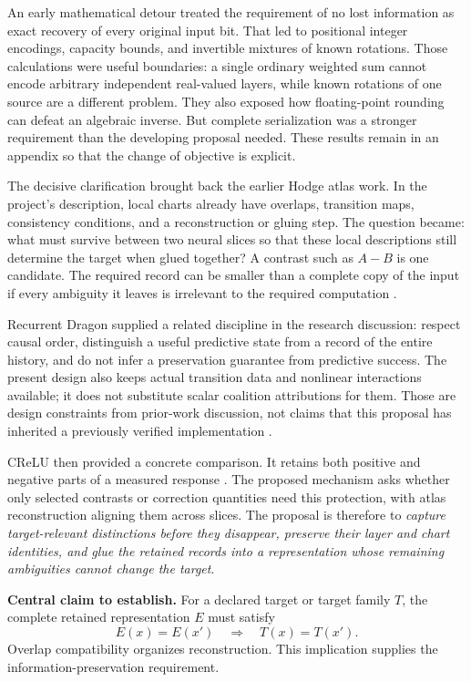 An early mathematical detour treated the requirement of no lost information as
exact recovery of every original input bit. That led to positional integer
encodings, capacity bounds, and invertible mixtures of known rotations. Those
calculations were useful boundaries: a single ordinary weighted sum cannot
encode arbitrary independent real-valued layers, while known rotations of one
source are a different problem. They also exposed how floating-point rounding
can defeat an algebraic inverse. But complete serialization was a stronger
requirement than the developing proposal needed. These results remain in an
appendix so that the change of objective is explicit.

The decisive clarification brought back the earlier Hodge atlas work. In the
project's description, local charts already have overlaps, transition maps,
consistency conditions, and a reconstruction or gluing step. The question became:
what must survive between two neural slices so that these local descriptions
still determine the target when glued together? A contrast such as \(A-B\) is
one candidate. The required record can be smaller than a complete copy of the
input if every ambiguity it leaves is irrelevant to the required computation
\cite{discussion}.

Recurrent Dragon supplied a related discipline in the research discussion:
respect causal order, distinguish a useful predictive state from a record of the
entire history, and do not infer a preservation guarantee from predictive success.
The present design also keeps actual transition data and nonlinear interactions
available; it does not substitute scalar coalition attributions for them.
Those are design constraints from prior-work discussion, not claims that this
proposal has inherited a previously verified implementation \cite{discussion}.

CReLU then provided a concrete comparison. It retains both positive and negative
parts of a measured response \cite{crelu}. The proposed mechanism asks whether only selected
contrasts or correction quantities need this protection, with atlas reconstruction
aligning them across slices. The proposal is therefore to \emph{capture
target-relevant distinctions before they disappear, preserve their layer and
chart identities, and glue the retained records into a representation whose
remaining ambiguities cannot change the target}.

\begin{keybox}
\textbf{Central claim to establish.}
For a declared target or target family \(T\), the complete retained representation
\(E\) must satisfy
\[
  E(x)=E(x')\quad\Longrightarrow\quad T(x)=T(x').
\]
Overlap compatibility organizes reconstruction. This implication supplies the
information-preservation requirement.
\end{keybox}

